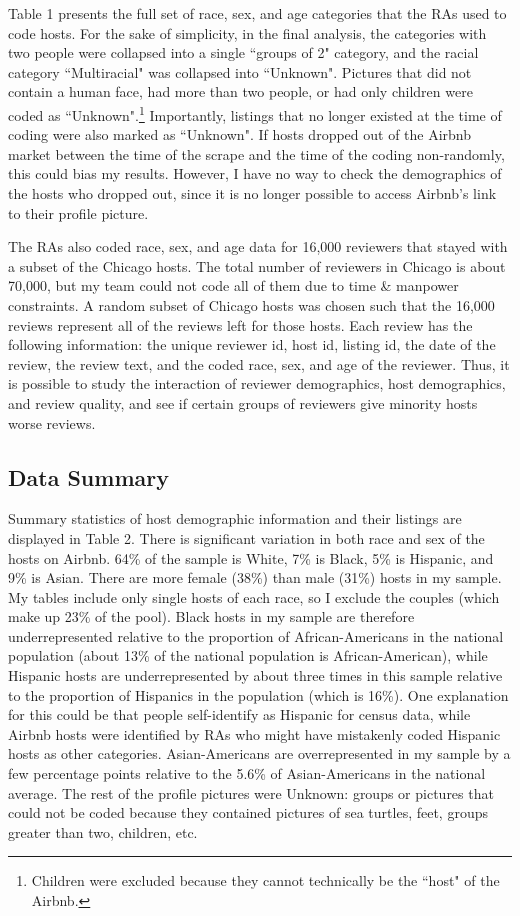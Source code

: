 \documentclass[11pt, oneside]{article}
\begin{document}
Table 1 presents the full set of race, sex, and age categories that the RAs used to code hosts. For the sake of simplicity, in the final analysis, the categories with two people were collapsed into a single ``groups of 2" category, and the racial category ``Multiracial" was collapsed into ``Unknown". Pictures that did not contain a human face, had more than two people, or had only children were coded as ``Unknown".\footnote{Children were excluded because they cannot technically be the ``host" of the Airbnb.} Importantly, listings that no longer existed at the time of coding were also marked as ``Unknown". If hosts dropped out of the Airbnb market between the time of the scrape and the time of the coding non-randomly, this could bias my results. However, I have no way to check the demographics of the hosts who dropped out, since it is no longer possible to access Airbnb's link to their profile picture. 

The RAs also coded race, sex, and age data for 16,000 reviewers that stayed with a subset of the Chicago hosts. The total number of reviewers in Chicago is about 70,000, but my team could not code all of them due to time \& manpower constraints. A random subset of Chicago hosts was chosen such that the 16,000 reviews represent all of the reviews left for those hosts. Each review has the following information: the unique reviewer id, host id, listing id, the date of the review, the review text, and the coded race, sex, and age of the reviewer. Thus, it is possible to study the interaction of reviewer demographics, host demographics, and review quality, and see if certain groups of reviewers give minority hosts worse reviews.   




\subsection{Data Summary} %

Summary statistics of host demographic information and their listings are displayed in Table 2. There is significant variation in both race and sex of the hosts on Airbnb. 64\% of the sample is White, 7\% is Black, 5\% is Hispanic, and 9\% is Asian. There are more female (38\%) than male (31\%) hosts in my sample. My tables include only single hosts of each race, so I exclude the couples (which make up 23\% of the pool). Black hosts in my sample are therefore underrepresented relative to the proportion of African-Americans in the national population (about 13\% of the national population is African-American), while Hispanic hosts are underrepresented by about three times in this sample relative to the proportion of Hispanics in the population (which is 16\%). One explanation for this could be that people self-identify as Hispanic for census data, while Airbnb hosts were identified by RAs who might have mistakenly coded Hispanic hosts as other categories. Asian-Americans are overrepresented in my sample by a few percentage points relative to the 5.6\% of Asian-Americans in the national average.\cite{census} The rest of the profile pictures were Unknown: groups or pictures that could not be coded because they contained pictures of sea turtles, feet, groups greater than two, children, etc. 
\end{document}
